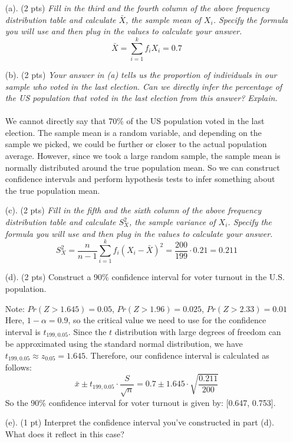 \documentclass{./../../Latex/tests}
\begin{document}
 \begin{enumerate}
 \item[(a).] (2 pts) \textit{Fill in the third and the fourth column of the above frequency distribution table and calculate $\bar{X}$,  the sample mean of $X_i$. Specify the formula you will use and then plug in the values to calculate your answer.} \\
$$\bar{X} = \sum_{i=1}^k f_i X_i = 0.7  $$
\item[(b).] (2 pts) \textit{Your answer in (a) tells us the proportion of individuals in our sample who voted in the last election. Can we directly infer the percentage of the US population that voted in the last election from this answer? Explain.} \\~\\
We cannot directly say that 70\% of the US population voted in the last election. The sample mean is a random variable, and depending on the sample we picked, we could be further or closer to the actual population average. However, since we took a large random sample, the sample mean is normally distributed around the true population mean. So we can construct confidence intervals and perform hypothesis tests to infer something about the true population mean. 
\vspace{1em} \\
\item[(c).] (2 pts) \textit{Fill in the fifth and the sixth column of the above frequency distribution table and calculate $S^2_X$,  the sample variance of $X_i$. Specify the formula you will use and then plug in the values to calculate your answer. } 
$$ S_X^2 = \frac{n}{n-1} \sum_{i=1}^k f_i (X_i-\bar{X})^2 = \frac{200}{199}\cdot 0.21 = 0.211$$
\item[(d).] (2 pts) Construct a 90\% confidence interval for voter turnout in the U.S. population.

Note: $Pr(Z>1.645) = 0.05$, $Pr(Z>1.96) = 0.025$, $Pr(Z>2.33) = 0.01$ \\

Here, \(1-\alpha =0.9\), so the critical value we need to use for the confidence interval is \(t_{199, 0.05}\). Since the \(t\) distribution with large degrees of freedom can be approximated using the standard normal distribution, we have \(t_{199, 0.05} \approx z_{0.05}=1.645\). Therefore, our confidence interval is calculated as follows:
\[
\bar{x} \pm t_{199,0.05} \cdot \frac{S}{\sqrt{n}} = 0.7 \pm 1.645 \cdot \sqrt{\frac{0.211}{200}}
\]
So the 90\% confidence interval for voter turnout is given by: [0.647, 0.753].
\item[(e).] (1 pt) Interpret the confidence interval you’ve constructed in part (d). What does it reflect in this case? 


\end{enumerate}
\end{document}
